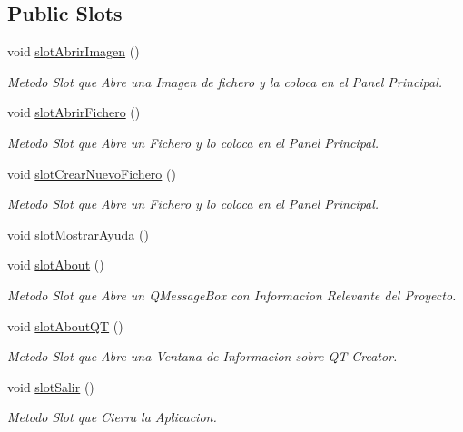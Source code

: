 \subsection*{Public Slots}
\begin{DoxyCompactItemize}
\item 
void \hyperlink{classCAplicacion_ab51359b6a7881206fe6ac46e0ca982f3}{slot\+Abrir\+Imagen} ()
\begin{DoxyCompactList}\small\item\em Metodo Slot que Abre una Imagen de fichero y la coloca en el Panel Principal. \end{DoxyCompactList}\item 
void \hyperlink{classCAplicacion_a3e11d14b05a911fd2e5f5da768787ac2}{slot\+Abrir\+Fichero} ()
\begin{DoxyCompactList}\small\item\em Metodo Slot que Abre un Fichero y lo coloca en el Panel Principal. \end{DoxyCompactList}\item 
void \hyperlink{classCAplicacion_a7a3f8e296b920f40fa0926d9119fb681}{slot\+Crear\+Nuevo\+Fichero} ()
\begin{DoxyCompactList}\small\item\em Metodo Slot que Abre un Fichero y lo coloca en el Panel Principal. \end{DoxyCompactList}\item 
void \hyperlink{classCAplicacion_a153d05a24b19b303d73aaa531286975f}{slot\+Mostrar\+Ayuda} ()
\item 
void \hyperlink{classCAplicacion_a9ac9b20ed3bd1f2750ee7649ad899f79}{slot\+About} ()
\begin{DoxyCompactList}\small\item\em Metodo Slot que Abre un Q\+Message\+Box con Informacion Relevante del Proyecto. \end{DoxyCompactList}\item 
void \hyperlink{classCAplicacion_a2950d0854e6445bf5159e7a5e65f151d}{slot\+About\+QT} ()
\begin{DoxyCompactList}\small\item\em Metodo Slot que Abre una Ventana de Informacion sobre QT Creator. \end{DoxyCompactList}\item 
void \hyperlink{classCAplicacion_af05758409bf701f83ae66333c25b8464}{slot\+Salir} ()
\begin{DoxyCompactList}\small\item\em Metodo Slot que Cierra la Aplicacion. \end{DoxyCompactList}\item 

\end{DoxyCompactItemize}
